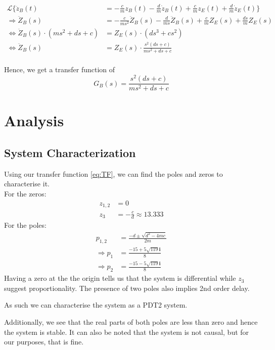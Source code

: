 \documentclass{article}
\begin{document}
\begin{align*}
    \mathscr{L}\{\ddot{z}_{B}(t) &=-\frac{c}{m}z_{B}(t)-\frac{d}{m}\dot{z}_{B}(t)+\frac{c}{m}z_{E}(t)+\frac{d}{m}\dot{z}_{E}(t)\}
    \\
    \Rightarrow\ddot{Z}_{B}(s) &= -\frac{c}{ms^2}\ddot{Z}_{B}(s)-\frac{d}{ms}\ddot{Z}_{B}(s)+\frac{c}{m}Z_{E}(s)+\frac{ds}{m}Z_{E}(s)
    \\
    \Leftrightarrow\ddot{Z}_{B}(s)\cdot(ms^2+ds+c) &= Z_E(s)\cdot(ds^3+cs^2)
    \\
    \Leftrightarrow \ddot{Z}_{B}(s) &= Z_E(s)\cdot \frac{s^2(ds+c)}{ms^2+ds+c}
\end{align*}
\\
Hence, we get a transfer function of 
\begin{equation}
    G_B(s)= \frac{s^2(ds+c)}{ms^2+ds+c}
    \label{eq:TF}
\end{equation}

\section{Analysis}
\subsection{System Characterization}
Using our transfer function \eqref{eq:TF}, we can find the poles and zeros to characterise it. 
\\
For the zeros:
\begin{align*}
    z_{1,2} &=0 \\
    z_3 &= -\frac{c}{d} \approx 13.333
\end{align*}
For the poles:
\begin{align*}
    p_{1,2} &=\frac{-d\pm\sqrt{d^{2}-4mc}}{2m}\\
    \Rightarrow p_1 &= \frac{-15+5\sqrt{119}\mathbf{i}}{8}\\
    \Rightarrow p_2 &= \frac{-15-5\sqrt{119}\mathbf{i}}{8}
\end{align*}
Having a zero at the the origin tells us that the system is differential while $z_3$ suggest proportionality. The presence of two poles also implies 2nd order delay. 

\vspace{1em}

As such we can characterise the system as a PDT2 system. 

\vspace{1em}

Additionally, we see that the real parts of both poles are less than zero and hence the system is stable. It can also be noted that the system is not causal, but for our purposes, that is fine. 
\end{document}

